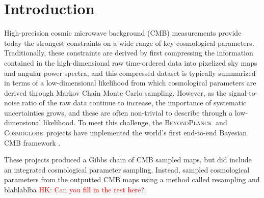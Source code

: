 \documentclass[twocolumn]{../common/aa}
\newcommand{\BP}{\textsc{BeyondPlanck}}
\newcommand{\cosmoglobe}{\textsc{Cosmoglobe}}
\begin{document}

\maketitle

\tableofcontents




\section{Introduction}
\label{sec:introduction}

  High-precision cosmic microwave background (CMB) measurements provide today the strongest constraints on a wide range of key cosmological parameters. Traditionally, these constraints are derived by first compressing the information contained in the high-dimensional raw time-ordered data into pixelized sky maps and angular power spectra, and this compressed dataset is typically summarized in terms of a low-dimensional likelihood from which cosmological parameters are derived through Markov Chain Monte Carlo sampling. However, as the signal-to-noise ratio of the raw data continue to increase, the importance of systematic uncertainties grows, and these are often non-trivial to describe through a low-dimensional likelihood. To meet this challenge, the \BP\ and \cosmoglobe\ projects have implemented the world's first end-to-end Bayesian CMB framework \citep{bp01, watts2023_dr1}.

  These projects produced a Gibbs chain of CMB sampled maps, but did include an integrated cosmological parameter sampling.  Instead, \citet{bp12} sampled cosmological parameters from the outputted CMB maps using a method called resampling and blablablba \textcolor{red}{HK: Can you fill in the rest here?}.
\end{document}
